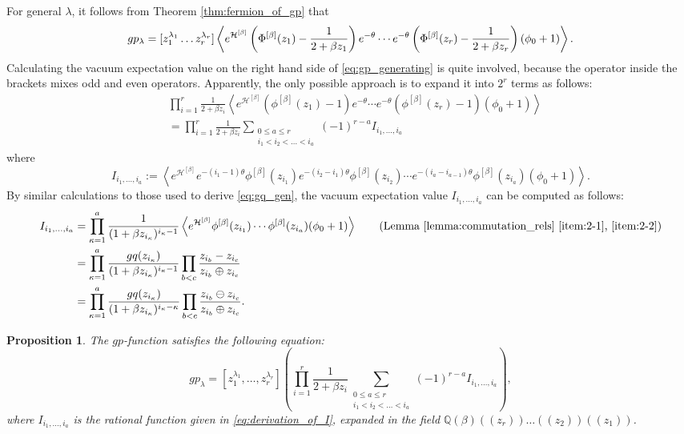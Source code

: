 \documentclass{amsart}
\newtheorem{prop}[thm]{Proposition}
\def\QQ{\mathord{\mathbb{Q}}}
\begin{document}
For general $\lambda$, it follows from Theorem \ref{thm:fermion_of_gp} that
\begin{equation}\label{eq:gp_generating}
gp_\lambda=[z_1^{\lambda_1}\dots z_r^{\lambda_r}]
\left\langle
e^{\mathcal{H}^{[\beta]}}
\left(
\Phi^{[\beta]}(z_1)-\frac{1}{2+\beta z_1}
\right)
e^{-\theta}
\cdots
e^{-\theta}
\left(
\Phi^{[\beta]}(z_r)-\frac{1}{2+\beta z_r}
\right)
(\phi_0+1)\allowdisplaybreaks
\right\rangle.
\end{equation}
Calculating the vacuum expectation value on the right hand side of \eqref{eq:gp_generating} is quite involved, because the operator inside the brackets mixes odd and even operators. 
Apparently, the only possible approach is to expand it into $2^r$ terms as follows:
\[
\begin{aligned}
&\prod_{i=1}^r\frac{1}{2+\beta z_i}
\left\langle
e^{\mathcal{H}^{[\beta]}}
\left(
\phi^{[\beta]}(z_1)-1
\right)
e^{-\theta}
\cdots
e^{-\theta}
\left(
\phi^{[\beta]}(z_r)-1
\right)
(\phi_0+1)
\right\rangle\\
&=
\prod_{i=1}^r\frac{1}{2+\beta z_i}
\sum_{
\substack{
0\leq a\leq r\\
i_1<i_2<\dots<i_a
}
}
(-1)^{r-a}I_{i_1,\dots,i_a}
\end{aligned}
\]
where 
\[
I_{i_1,\dots,i_a}:=\left\langle
e^{\mathcal{H}^{[\beta]}}
e^{-(i_1-1)\theta}
\phi^{[\beta]}(z_{i_1})
e^{-(i_2-i_1)\theta}
\phi^{[\beta]}(z_{i_2})
\cdots
e^{-(i_a-i_{a-1})\theta}
\phi^{[\beta]}(z_{i_a})
(\phi_0+1)
\right\rangle.
\]
By similar calculations to those used to derive \eqref{eq:gq_gen}, the vacuum expectation value $I_{i_1,\dots,i_a}$ can be computed as follows:
\begin{align}
I_{i_1,\dots,i_a}
&=\prod_{\kappa = 1}^a
\frac{1}{(1+\beta z_{i_\kappa})^{i_\kappa-1}}
\left\langle
e^{\mathcal{H}^{[\beta]}}
\phi^{[\beta]}(z_{i_1})
\cdots
\phi^{[\beta]}(z_{i_a})
(\phi_0+1)
\right\rangle\qquad (\text{Lemma \ref{lemma:commutation_rels} \eqref{item:2-1}, \eqref{item:2-2}})
\label{eq:derivation_of_I}
\\
&=\prod_{\kappa = 1}^a
\frac{gq(z_{i_\kappa})}{(1+\beta z_{i_\kappa})^{i_\kappa-1}}
\prod_{b<c}\frac{z_{i_b}-z_{i_c}}{z_{i_b}\oplus z_{i_c}}
\nonumber\\
&=\prod_{\kappa = 1}^a
\frac{gq(z_{i_\kappa})}{(1+\beta z_{i_\kappa})^{i_\kappa-\kappa}}
\prod_{b<c}\frac{z_{i_b}\ominus z_{i_c}}{z_{i_b}\oplus z_{i_c}}.\nonumber
\end{align}

\begin{prop}\label{prop:gen_of_gp}
The $gp$-function satisfies the following equation:
\[
gp_\lambda=
[z_1^{\lambda_1},\dots,z_r^{\lambda_r}]
\left(
\prod_{i=1}^r\frac{1}{2+\beta z_i}
\sum_{
\substack{
0\leq a\leq r\\
i_1<i_2<\dots<i_a
}
}
(-1)^{r-a}I_{i_1,\dots,i_a}
\right),
\]
where $I_{i_1,\dots,i_a}$ is the rational function given in \eqref{eq:derivation_of_I}, expanded in the field $\QQ(\beta)((z_r))\dots ((z_2))((z_1))$.
\end{prop}
\end{document}
